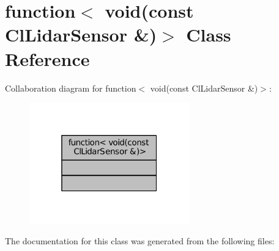 \hypertarget{classstd_1_1function_3_01void_07const_01ClLidarSensor_01_6_08_4}{}\section{function$<$ void(const Cl\+Lidar\+Sensor \&)$>$ Class Reference}
\label{classstd_1_1function_3_01void_07const_01ClLidarSensor_01_6_08_4}


Collaboration diagram for function$<$ void(const Cl\+Lidar\+Sensor \&)$>$\+:
\nopagebreak
\begin{figure}[H]
\begin{center}
\leavevmode
\includegraphics[width=196pt]{classstd_1_1function_3_01void_07const_01ClLidarSensor_01_6_08_4__coll__graph}
\end{center}
\end{figure}


The documentation for this class was generated from the following files\+: